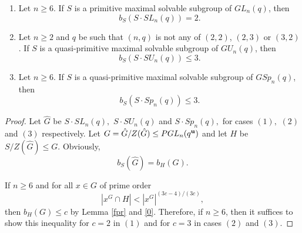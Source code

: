 \begin{Th}\label{sch} 
 $\phantom{gg}$
\begin{enumerate}[font=\normalfont]
\item Let $n \ge 6. $ If $S$ is a primitive maximal solvable  subgroup of $GL_n(q)$, then $$b_S(S \cdot SL_n(q)) = 2.$$ 
\item Let $n \ge 2$ and $q$ be such that $(n,q)$ is not any of $(2,2)$, $(2,3)$ or $(3,2)$. If $S$ is a quasi-primitive maximal solvable  subgroup of $GU_n(q)$, then $$b_S(S \cdot SU_n(q)) \le 3.$$ 
\item Let $n \ge 6. $ If $S$ is a quasi-primitive maximal solvable subgroup of $GSp_n(q)$, then $$b_S(S \cdot Sp_n(q)) \le 3.$$ 
\end{enumerate}
\end{Th}
\begin{proof}

Let $\hat{G}$ be $S \cdot SL_n(q),$ $S \cdot SU_n(q)$ and $S \cdot Sp_n(q),$ for  cases $(1),$ $(2)$ and $(3)$ respectively.  Let $G=\hat{G}/Z(\hat{G})\le PGL_n(q^{\bf u})$ and let $H$ be $S/Z(\hat{G})\le G.$ Obviously, 
$$b_S(\hat{G})=b_H(G).$$

If $n \ge 6$ and for all $x \in G$ of prime order   
$$|x^G \cap H| < |x^G|^{(3c-4)/(3c)},$$
then $b_H(G) \le c$ by Lemma \ref{fpr}  and \eqref{0}. Therefore, if $n \ge 6$, then it suffices to show this inequality for $c=2$ in $(1)$ and for $c=3$ in cases $(2)$ and $(3)$. 






\end{proof}
